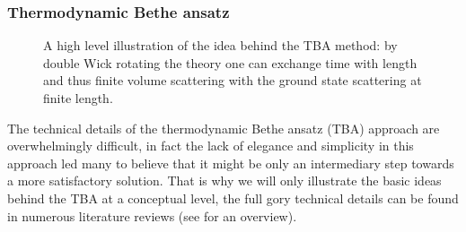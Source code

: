 \subsubsection{Thermodynamic Bethe ansatz}


\begin{figure}[t]
\centering
{}
\caption{A high level illustration of the idea behind the TBA method: by double Wick rotating the theory one can exchange time with length and thus finite volume scattering with the ground state scattering at finite length.}
\label{fig:tba_cylinders}
\end{figure}

The technical details of the thermodynamic Bethe ansatz (TBA) approach are overwhelmingly difficult, in fact the lack of elegance and simplicity in this approach led many to believe that it might be only an intermediary step towards a more satisfactory solution. 
That is why we will only illustrate the basic ideas behind the TBA at a conceptual level, the full gory technical details can be found in numerous literature reviews (see \cite{Bajnok:2010ke} for an overview). 

